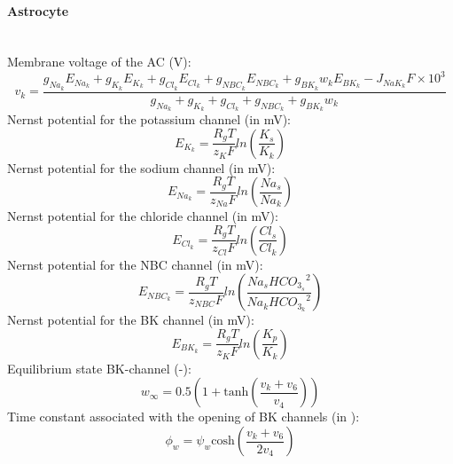 \paragraph{Astrocyte}~\\
%
Membrane voltage of the \gls{AC} (V):
\begin{equation} \label{eq:v_k}
v_k=\frac{g_{Na_k}E_{Na_k}+g_{K_k}E_{K_k}+g_{Cl_k}E_{Cl_k}+g_{NBC_k}E_{NBC_k} + g_{BK_k}w_kE_{BK_k} -J_{NaK_k}F \times 10^3 }{ g_{Na_k}+g_{K_k}+g_{Cl_k}+g_{NBC_k}+g_{BK_k}w_k }
\end{equation}
%
Nernst potential for the potassium channel (in mV):
\begin{equation} \label{eq:E_K}
E_{K_k}=\frac{R_gT}{z_K F}ln\left( \frac{K_s}{K_k}\right) 
\end{equation}
%
Nernst potential for the sodium channel (in mV):
\begin{equation} \label{eq:E_Na}
E_{Na_k}=\frac{R_gT}{z_{Na} F}ln\left( \frac{Na_s}{Na_k}\right) 
\end{equation}
%
Nernst potential for the chloride channel (in mV):
\begin{equation} \label{eq:E_Cl}
E_{Cl_k}=\frac{R_gT}{z_{Cl} F}ln\left( \frac{Cl_s}{Cl_k}\right) 
\end{equation}
%
Nernst potential for the NBC channel (in mV):
\begin{equation} \label{eq:E_NBC}
E_{NBC_k}=\frac{R_gT}{z_{NBC} F}ln\left( \frac{Na_s {HCO_{3_s}}^2}{Na_k {HCO_{3_k}}^2}\right) 
\end{equation}
Nernst potential for the BK channel (in mV):
\begin{equation} \label{eq:E_BK}
E_{BK_k}=\frac{R_gT}{z_K F}ln\left( \frac{K_p}{K_k}\right) 
\end{equation}
%
Equilibrium state BK-channel (-):
\begin{equation} \label{eq:winf}
w_{\infty}=0.5 \left(1+\mathrm{tanh}\left(\frac{v_{k}+v_{6} }{v_{4}} \right)  \right) 
\end{equation}
%
Time constant associated with the opening of BK channels	 (in \pers):
\begin{equation} \label{eq:phin}
\phi_{w}=\psi_{w}\mathrm{cosh}\left( \frac{v_{k}+v_{6}}{2v_{4}}\right) 
\end{equation}

